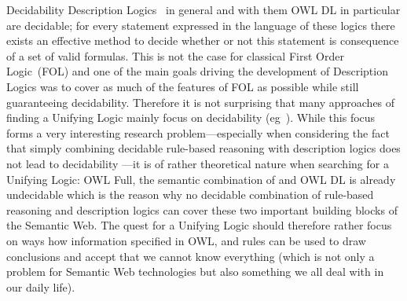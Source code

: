 \begin{paragraph}{Decidability}
 Description Logics~\cite{dl} in general and with them OWL DL \cite{owldsem} in particular are decidable; for every statement expressed in the language of these logics there
exists an effective method to decide whether or not this statement is consequence of a set of valid formulas. This is not the case for classical 
First Order Logic~(FOL) and one of the main goals driving the development of Description Logics was to cover as much of the features of FOL as possible while still guaranteeing 
decidability. Therefore it is not surprising that many approaches of finding a Unifying Logic mainly focus on decidability (eg~\cite{unilogic,dllog}). 
While this focus forms a very interesting research problem---especially when considering the fact that simply combining decidable rule-based reasoning with description logics 
does not lead to decidability \cite{orl}---it is of rather theoretical nature when searching for a Unifying Logic: OWL Full, 
the semantic combination of \rdf and OWL DL is already undecidable which is the reason why no decidable combination of rule-based reasoning and description logics can cover these 
two important building blocks of the Semantic Web.
%
% 
The quest for a Unifying Logic should therefore rather focus on ways how information specified in OWL, \rdf and rules can be used to draw conclusions
and accept that we cannot know everything (which is not only a problem  for Semantic Web technologies but also something we all deal with in our daily life). 
\end{paragraph}






